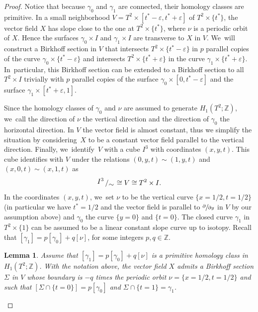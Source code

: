 \documentclass[JEP,XML,SOM,Unicode,NoEqCountersInSection,NoFloatCountersInSection,published]{cedram}
\newcommand{\spp}[2]{\sfrac{\partial#1}{\partial#2}}
\newtheorem{lemma}[theorem]{Lemma}
\theoremstyle{definition}
\newcommand{\bigslant}[2]{{\raisebox{.2em}{$#1$}\left/\raisebox{-.2em}{$#2$}\right.}}
\begin{document}
\begin{proof}
{Notice that because $\gamma_0$ and $\gamma_1$ are connected, their homology classes are primitive.} In a small neighborhood $V=T^2\times [t^*-\varepsilon,t^*+\varepsilon]$ of $T^2 \times \{t^*\}$, the vector field $X$ has slope close to the one at $T^2\times \{t^*
\}$, where $\nu$ is a periodic orbit of $X$. Hence the surfaces $\gamma_0\times I$ and $\gamma_1 \times I$ are transverse to $X$ in $V$. We~will construct a Birkhoff section in $V$ that intersects $T^2\times\{t^*-\varepsilon\}$ in $p$ parallel copies of the curve $\gamma_0 \times \{t^*-\varepsilon\}$ and intersects $T^2\times\{t^*+\varepsilon\}$ in the curve $\gamma_1\times \{t^*+\varepsilon\}$. In~particular, this Birkhoff section can be extended to a Birkhoff section to all $T^2\times I$ trivially with $p$ parallel copies of the surface $\gamma_0\times [0,t^*-\varepsilon]$ and the surface $\gamma_1 \times [t^*+\varepsilon,1]$.

{Since the homology classes of $\gamma_0$ and $\nu$ are assumed to generate $H_1(T^2;\mathbb{Z})$, we~call the direction of $\nu$ the vertical direction and the direction of $\gamma_0$ the horizontal direction.} In $V$ the vector field is almost constant, thus we simplify the situation by considering~$X$ to be a constant vector field parallel to the vertical direction. Finally, we~iden\-ti\-fy~$V$ with a cube $I^3$ with coordinates $(x,y,t)$. This cube identifies with $V$ under the relations $(0,y,t) \sim (1,y,t)$ and $(x,0,t) \sim (x,1,t)$ as
\[
\bigslant{I^3}{\sim} \cong V\cong T^2\times I.
\]
{In the coordinates $(x,y,t)$, we~set $\nu$ to be the vertical} curve $\{x=1/2,t=1/2\}$ (in particular we have $t^*=1/2$ and the vector field is parallel to $\spp{}{y}$ in $V$ by our assumption above) and $\gamma_0$ the curve $\{y=0\}$ and $\{t=0\}$.
The closed curve $\gamma_1$ in $T^2\times \{1\}$ can be assumed to be a linear constant slope curve up to isotopy. Recall that
$[\gamma_1]=p[\gamma_0]+ q[\nu]$,
for some integers $p,q\in \mathbb{Z}$.

\begin{lemma}\label{lem:Birk}
Assume that $[\gamma_1]=p [\gamma_0] + q [\nu]$ is a primitive homology class in $H_1(T^2;\mathbb{Z})$. With the notation above, the vector field $X$ admits a Birkhoff section $\Sigma$ in $V$ whose boundary is $-q$ times the periodic orbit $\nu=\{x=1/2, t=1/2\}$ and such that $[\Sigma\cap \{t=0\}] =p [\gamma_0]$ and $\Sigma \cap \{t=1\}=\gamma_1$.
\end{lemma}


\end{proof}
\end{document}
